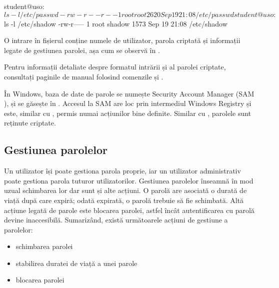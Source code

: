 \begin{screen}[caption={Permisiuni de acces pe fișierele de parole},label={lst:user:shadow-perm}]
student@uso:~$ ls -l /etc/passwd
-rw-r--r-- 1 root root 2620 Sep 19 21:08 /etc/passwd
student@uso:~$ ls -l /etc/shadow
-rw-r----- 1 root shadow 1573 Sep 19 21:08 /etc/shadow
\end{screen}

O intrare în fișierul  conține numele de utilizator, parola criptată și informații legate de gestiunea parolei, așa cum se observă în .


Pentru informații detaliate despre formatul intrării și al parolei criptate, consultați paginile de manual folosind comenzile  și .

În Windows, baza de date de parole se numește Security Account Manager (SAM ), și se găsește în .
Accesul la SAM are loc prin intermediul Windows Registry și este, similar cu , permis numai acțiunilor bine definite.
Similar cu , parolele sunt reținute criptate.

\subsection{Gestiunea parolelor}
\label{sec:user:manage-passwords}

Un utilizator își poate gestiona parola proprie, iar un utilizator administrativ poate gestiona parola tuturor utilizatorilor.
Gestiunea parolelor înseamnă în mod uzual schimbarea lor dar sunt și alte acțiuni.
O parolă are asociată o durată de viață după care expiră;
odată expirată, o parolă trebuie să fie schimbată.
Altă acțiune legată de parole este blocarea parolei, astfel încât autentificarea cu parolă devine inaccesibilă.
Sumarizând, există următoarele acțiuni de gestiune a parolelor:

\begin{itemize}
  \item schimbarea parolei
  \item stabilirea duratei de viață a unei parole
  \item blocarea parolei
\end{itemize}

